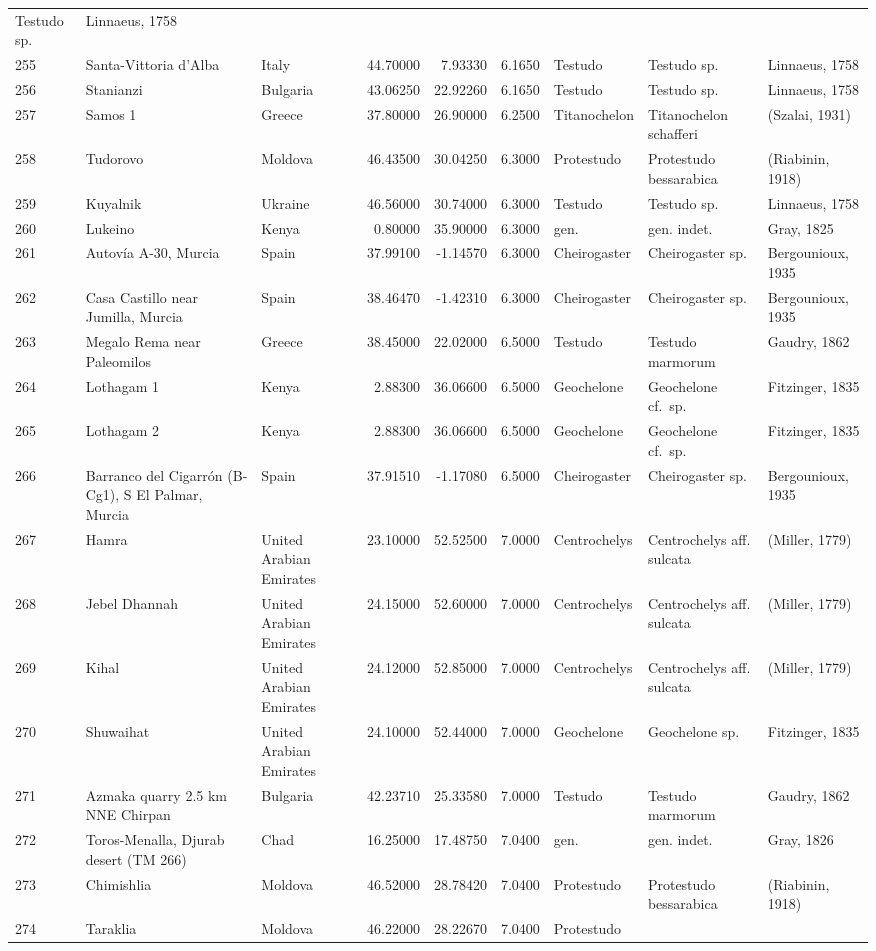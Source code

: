 \documentclass[]{article}
\begin{document}
\begin{longtable}[]{@{}lllrrrlll@{}}
Testudo sp. & Linnaeus, 1758\tabularnewline
255 & Santa-Vittoria d'Alba & Italy & 44.70000 & 7.93330 & 6.1650 &
Testudo & Testudo sp. & Linnaeus, 1758\tabularnewline
256 & Stanianzi & Bulgaria & 43.06250 & 22.92260 & 6.1650 & Testudo &
Testudo sp. & Linnaeus, 1758\tabularnewline
257 & Samos 1 & Greece & 37.80000 & 26.90000 & 6.2500 & Titanochelon &
Titanochelon schafferi & (Szalai, 1931)\tabularnewline
258 & Tudorovo & Moldova & 46.43500 & 30.04250 & 6.3000 & Protestudo &
Protestudo bessarabica & (Riabinin, 1918)\tabularnewline
259 & Kuyalnik & Ukraine & 46.56000 & 30.74000 & 6.3000 & Testudo &
Testudo sp. & Linnaeus, 1758\tabularnewline
260 & Lukeino & Kenya & 0.80000 & 35.90000 & 6.3000 & gen. & gen. indet.
& Gray, 1825\tabularnewline
261 & Autovía A-30, Murcia & Spain & 37.99100 & -1.14570 & 6.3000 &
Cheirogaster & Cheirogaster sp. & Bergounioux, 1935\tabularnewline
262 & Casa Castillo near Jumilla, Murcia & Spain & 38.46470 & -1.42310 &
6.3000 & Cheirogaster & Cheirogaster sp. & Bergounioux,
1935\tabularnewline
263 & Megalo Rema near Paleomilos & Greece & 38.45000 & 22.02000 &
6.5000 & Testudo & Testudo marmorum & Gaudry, 1862\tabularnewline
264 & Lothagam 1 & Kenya & 2.88300 & 36.06600 & 6.5000 & Geochelone &
Geochelone cf.~sp. & Fitzinger, 1835\tabularnewline
265 & Lothagam 2 & Kenya & 2.88300 & 36.06600 & 6.5000 & Geochelone &
Geochelone cf.~sp. & Fitzinger, 1835\tabularnewline
266 & Barranco del Cigarrón (B-Cg1), S El Palmar, Murcia & Spain &
37.91510 & -1.17080 & 6.5000 & Cheirogaster & Cheirogaster sp. &
Bergounioux, 1935\tabularnewline
267 & Hamra & United Arabian Emirates & 23.10000 & 52.52500 & 7.0000 &
Centrochelys & Centrochelys aff. sulcata & (Miller, 1779)\tabularnewline
268 & Jebel Dhannah & United Arabian Emirates & 24.15000 & 52.60000 &
7.0000 & Centrochelys & Centrochelys aff. sulcata & (Miller,
1779)\tabularnewline
269 & Kihal & United Arabian Emirates & 24.12000 & 52.85000 & 7.0000 &
Centrochelys & Centrochelys aff. sulcata & (Miller, 1779)\tabularnewline
270 & Shuwaihat & United Arabian Emirates & 24.10000 & 52.44000 & 7.0000
& Geochelone & Geochelone sp. & Fitzinger, 1835\tabularnewline
271 & Azmaka quarry 2.5 km NNE Chirpan & Bulgaria & 42.23710 & 25.33580
& 7.0000 & Testudo & Testudo marmorum & Gaudry, 1862\tabularnewline
272 & Toros-Menalla, Djurab desert (TM 266) & Chad & 16.25000 & 17.48750
& 7.0400 & gen. & gen. indet. & Gray, 1826\tabularnewline
273 & Chimishlia & Moldova & 46.52000 & 28.78420 & 7.0400 & Protestudo &
Protestudo bessarabica & (Riabinin, 1918)\tabularnewline
274 & Taraklia & Moldova & 46.22000 & 28.22670 & 7.0400 & Protestudo &

\end{longtable}
\end{document}

